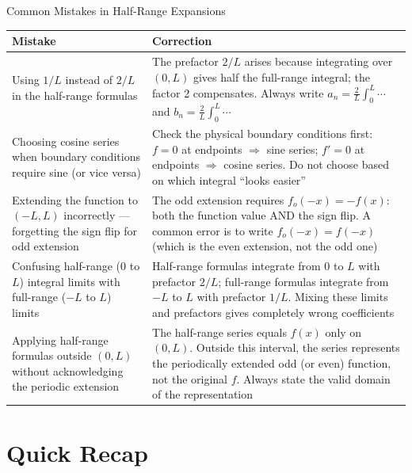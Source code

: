 \documentclass[12pt,a4paper]{article}
\begin{document}
\begin{mistakebox}{Common Mistakes in Half-Range Expansions}
\begin{tabular}{p{5.5cm} p{8cm}}
\toprule
\textbf{Mistake} & \textbf{Correction} \\
\midrule
Using $1/L$ instead of $2/L$ in the half-range formulas & The prefactor $2/L$ arises because integrating over $(0,L)$ gives half the full-range integral; the factor 2 compensates. Always write $a_n = \frac{2}{L}\int_0^L\cdots$ and $b_n = \frac{2}{L}\int_0^L\cdots$ \\
\midrule
Choosing cosine series when boundary conditions require sine (or vice versa) & Check the physical boundary conditions first: $f=0$ at endpoints $\Rightarrow$ sine series; $f'=0$ at endpoints $\Rightarrow$ cosine series. Do not choose based on which integral ``looks easier'' \\
\midrule
Extending the function to $(-L,L)$ incorrectly --- forgetting the sign flip for odd extension & The odd extension requires $f_o(-x) = -f(x)$: both the function value AND the sign flip. A common error is to write $f_o(-x) = f(-x)$ (which is the even extension, not the odd one) \\
\midrule
Confusing half-range ($0$ to $L$) integral limits with full-range ($-L$ to $L$) limits & Half-range formulas integrate from $0$ to $L$ with prefactor $2/L$; full-range formulas integrate from $-L$ to $L$ with prefactor $1/L$. Mixing these limits and prefactors gives completely wrong coefficients \\
\midrule
Applying half-range formulas outside $(0,L)$ without acknowledging the periodic extension & The half-range series equals $f(x)$ only on $(0,L)$. Outside this interval, the series represents the periodically extended odd (or even) function, not the original $f$. Always state the valid domain of the representation \\
\bottomrule
\end{tabular}
\end{mistakebox}

\section{Quick Recap}
\end{document}
